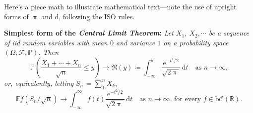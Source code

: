 \documentclass[11pt]{article}
\begin{document}
Here's a piece math to illustrate mathematical text---note the use of upright forms of $\uppi$ and $\mathrm{d}$, following the ISO rules.

\textbf{Simplest form of the \textit{Central Limit Theorem}:} \textit{Let
$X_1$, $X_2,\cdots$ be a sequence of iid random variables with mean $0$ 
and variance $1$ on a probability space $(\Omega,\mathcal{F},\mathbb{P})$. Then}
\[\mathbb{P}\left(\frac{X_1+\cdots+X_n}{\sqrt{n}}\le y\right)\to\mathfrak{N}(y)\coloneq
\int_{-\infty}^y \frac{\mathrm{e}^{-t^2/2}}{\sqrt{2\uppi}}\,
\mathrm{d}t\quad\mbox{as $n\to\infty$,}\]
\textit{or, equivalently, letting} $S_n\coloneq\sum_1^n X_k$,
\[\mathbb{E} f\left(S_n/\sqrt{n}\right)\to \int_{-\infty}^\infty f(t)
\frac{\mathrm{e}^{-t^2/2}}{\sqrt{2\uppi}}\,\mathrm{d}t
\quad\mbox{as $n\to\infty$, for every $f\in\mathrm{b}
\mathcal{C}(\mathbb{R})$.}\]
\end{document}

